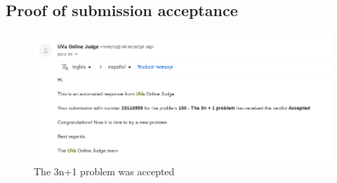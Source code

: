 \subsection{Proof of submission acceptance}

\begin{figure}[h]
    \includegraphics[scale=0.50]{sections/2competitive_programming/figures/3n1.png}
    \caption{The 3n+1 problem was accepted}
    \centering
\end{figure}